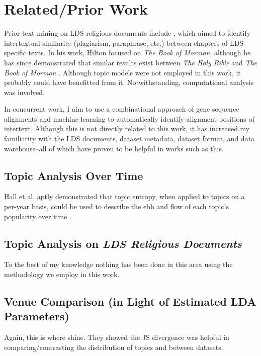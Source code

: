 \section {Related/Prior Work}

Prior text mining on LDS religious documents include \cite{hilton-2008-intertext-abinadi}, which aimed to identify intertextual similarity (plagiarism, paraphrase, etc.) between chapters of LDS-specific texts. In his work, Hilton focused on \textit{The Book of Mormon}, although he has since demonstrated that similar results exist between \textit{The Holy Bible} and \textit{The Book of Mormon} \cite{hilton_2008_intertext_psalms}. Although topic models were not employed in this work, it probably could have benefitted from it. Notwithstanding, computational analysis was involved.

In concurrent work, I aim to use a combinational approach of gene sequence alignments and machine learning to automatically identify alignment positions of intertext. Although this is not directly related to this work, it has increased my familiarity with the LDS documents, dataset metadata, dataset format, and data warehouse--all of which have proven to be helpful in works such as this.

\subsection {Topic Analysis Over Time}
Hall et al. aptly demonstrated that topic entropy, when applied to topics on a per-year basis, could be used to describe the ebb and flow of each topic's popularity over time \cite{hall-jurafsky-manning:2008:EMNLP}.

\subsection{Topic Analysis on \textit{LDS Religious Documents}}
To the best of my knowledge nothing has been done in this area using the methodology we employ in this work. %

\subsection{Venue Comparison (in Light of Estimated LDA Parameters)}
Again, this is where \cite{hall-jurafsky-manning:2008:EMNLP} shine. They showed the JS divergence was helpful in comparing/contrasting the distribution of topics and between datasets.
